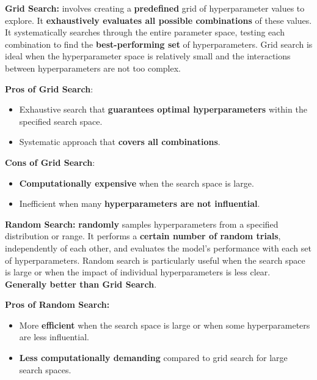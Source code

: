 \begin{definition}
    \textbf{Grid Search:} involves creating a \textbf{predefined} grid of hyperparameter values to explore. It \textbf{exhaustively evaluates all possible combinations} of these values. It systematically searches through the entire parameter space, testing each combination to find the \textbf{best-performing set} of hyperparameters. Grid search is ideal when the hyperparameter space is relatively small and the interactions between hyperparameters are not too complex.
\end{definition}

\textbf{Pros of Grid Search}:

\begin{itemize}
    \item Exhaustive search that \textbf{guarantees optimal hyperparameters} within the specified search space.
    \item Systematic approach that \textbf{covers all combinations}.
\end{itemize}

\textbf{Cons of Grid Search}:

\begin{itemize}
    \item \textbf{Computationally expensive} when the search space is large.
    \item Inefficient when many \textbf{hyperparameters are not influential}.
\end{itemize}

\begin{definition}
    \textbf{Random Search:} \textbf{randomly} samples hyperparameters from a specified distribution or range. It performs a \textbf{certain number of random trials}, independently of each other, and evaluates the model's performance with each set of hyperparameters. Random search is particularly useful when the search space is large or when the impact of individual hyperparameters is less clear.\textbf{ Generally better than Grid Search}.
\end{definition}

\textbf{Pros of Random Search:}

\begin{itemize}
    \item More \textbf{efficient} when the search space is large or when some hyperparameters are less influential.
    \item \textbf{Less computationally demanding} compared to grid search for large search spaces.
\end{itemize}

